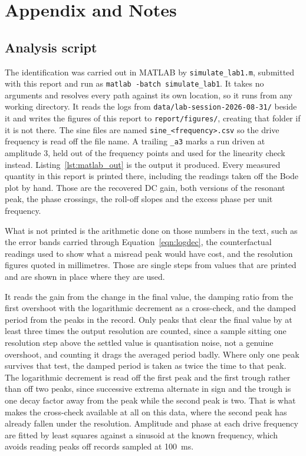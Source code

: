 \section{Appendix and Notes}\label{sec:appendix}

\subsection{Analysis script}

The identification was carried out in MATLAB by \texttt{simulate\_lab1.m}, submitted with this
report and run as \texttt{matlab -batch simulate\_lab1}. It takes no arguments and resolves
every path against its own location, so it runs from any working directory. It reads the logs
from \texttt{data/lab-session-2026-08-31/} beside it and writes the figures of this report to
\texttt{report/figures/}, creating that folder if it is not there. The sine files are named
\texttt{sine\_<frequency>.csv} so the drive frequency is read off the file name. A trailing \texttt{\_a3} marks a run driven at amplitude
$3$, held out of the frequency points and used for the linearity check instead.
Listing~\ref{lst:matlab_out} is the output it produced. Every measured quantity in this report
is printed there, including the readings taken off the Bode plot by hand. Those are the recovered DC
gain, both versions of the resonant peak, the phase crossings, the roll-off slopes and the
excess phase per unit frequency.

What is not printed is the arithmetic done on those numbers in the text, such as the error
bands carried through Equation~\ref{eqn:logdec}, the counterfactual readings used to show
what a misread peak would have cost, and the resolution figures quoted in millimetres. Those
are single steps from values that are printed and are shown in place where they are used.

It reads the gain from the change in the final value, the damping ratio from the first
overshoot with the logarithmic decrement as a cross-check, and the damped period from the
peaks in the record. Only peaks that clear the final value by at least three times the
output resolution are counted, since a sample sitting one resolution step above the settled
value is quantisation noise, not a genuine overshoot, and counting it drags the
averaged period badly. Where only one peak survives that test, the damped period is taken as
twice the time to that peak. The logarithmic decrement is read off the first peak and the
first trough rather than off two peaks, since successive extrema alternate in sign and the
trough is one decay factor away from the peak while the second peak is two. That is what
makes the cross-check available at all on this data, where the second peak has already
fallen under the resolution. Amplitude and phase at each drive frequency are fitted by least
squares against a sinusoid at the known frequency, which avoids reading peaks off records
sampled at 100~ms.

